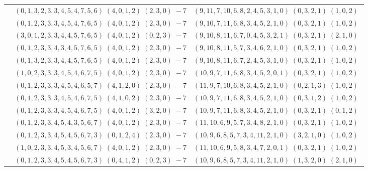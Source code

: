 \documentclass[11pt]{article}
\begin{document}
\begin{longtable}[l]{|c|c|c|}
 \cline{2-3} 
 & $(0 ,1 ,3 ,2 ,3 ,3 ,4 ,5 ,4 ,7 ,5 ,6) \;(4 ,0 ,1 ,2) \;(2 ,3 ,0) \;-7$ & $(9 ,11 ,7 ,10 ,6 ,8 ,2 ,4 ,5 ,3 ,1 ,0) \;(0 ,3 ,2 ,1) \;(1 ,0 ,2) \;$\\ 
 \cline{2-3} 
 & $(0 ,1 ,2 ,3 ,3 ,3 ,4 ,5 ,4 ,7 ,6 ,5) \;(4 ,0 ,1 ,2) \;(2 ,3 ,0) \;-7$ & $(9 ,10 ,7 ,11 ,6 ,8 ,3 ,4 ,5 ,2 ,1 ,0) \;(0 ,3 ,2 ,1) \;(1 ,0 ,2) \;$\\ 
 \cline{2-3} 
 & $(3 ,0 ,1 ,2 ,3 ,3 ,4 ,4 ,5 ,7 ,6 ,5) \;(4 ,0 ,1 ,2) \;(0 ,2 ,3) \;-7$ & $(9 ,10 ,8 ,11 ,6 ,7 ,0 ,4 ,5 ,3 ,2 ,1) \;(0 ,3 ,2 ,1) \;(2 ,1 ,0) \;$\\ 
 \cline{2-3} 
 & $(0 ,1 ,2 ,3 ,3 ,4 ,3 ,4 ,5 ,7 ,6 ,5) \;(4 ,0 ,1 ,2) \;(2 ,3 ,0) \;-7$ & $(9 ,10 ,8 ,11 ,5 ,7 ,3 ,4 ,6 ,2 ,1 ,0) \;(0 ,3 ,2 ,1) \;(1 ,0 ,2) \;$\\ 
 \cline{2-3} 
 & $(0 ,1 ,3 ,2 ,3 ,3 ,4 ,4 ,5 ,7 ,6 ,5) \;(4 ,0 ,1 ,2) \;(2 ,3 ,0) \;-7$ & $(9 ,10 ,8 ,11 ,6 ,7 ,2 ,4 ,5 ,3 ,1 ,0) \;(0 ,3 ,2 ,1) \;(1 ,0 ,2) \;$\\ 
 \cline{2-3} 
 & $(1 ,0 ,2 ,3 ,3 ,3 ,4 ,5 ,4 ,6 ,7 ,5) \;(4 ,0 ,1 ,2) \;(2 ,3 ,0) \;-7$ & $(10 ,9 ,7 ,11 ,6 ,8 ,3 ,4 ,5 ,2 ,0 ,1) \;(0 ,3 ,2 ,1) \;(1 ,0 ,2) \;$\\ 
 \cline{2-3} 
 & $(0 ,1 ,2 ,3 ,3 ,3 ,4 ,5 ,4 ,6 ,5 ,7) \;(4 ,1 ,2 ,0) \;(2 ,3 ,0) \;-7$ & $(11 ,9 ,7 ,10 ,6 ,8 ,3 ,4 ,5 ,2 ,1 ,0) \;(0 ,2 ,1 ,3) \;(1 ,0 ,2) \;$\\ 
 \cline{2-3} 
 & $(0 ,1 ,2 ,3 ,3 ,3 ,4 ,5 ,4 ,6 ,7 ,5) \;(4 ,1 ,0 ,2) \;(2 ,3 ,0) \;-7$ & $(10 ,9 ,7 ,11 ,6 ,8 ,3 ,4 ,5 ,2 ,1 ,0) \;(0 ,3 ,1 ,2) \;(1 ,0 ,2) \;$\\ 
 \cline{2-3} 
 & $(0 ,1 ,2 ,3 ,3 ,3 ,4 ,5 ,4 ,6 ,7 ,5) \;(4 ,0 ,1 ,2) \;(3 ,2 ,0) \;-7$ & $(10 ,9 ,7 ,11 ,6 ,8 ,3 ,4 ,5 ,2 ,1 ,0) \;(0 ,3 ,2 ,1) \;(0 ,1 ,2) \;$\\ 
 \cline{2-3} 
 & $(0 ,1 ,2 ,3 ,3 ,4 ,5 ,4 ,3 ,5 ,6 ,7) \;(4 ,0 ,1 ,2) \;(2 ,3 ,0) \;-7$ & $(11 ,10 ,6 ,9 ,5 ,7 ,3 ,4 ,8 ,2 ,1 ,0) \;(0 ,3 ,2 ,1) \;(1 ,0 ,2) \;$\\ 
 \cline{2-3} 
 & $(0 ,1 ,2 ,3 ,3 ,4 ,5 ,4 ,5 ,6 ,7 ,3) \;(0 ,1 ,2 ,4) \;(2 ,3 ,0) \;-7$ & $(10 ,9 ,6 ,8 ,5 ,7 ,3 ,4 ,11 ,2 ,1 ,0) \;(3 ,2 ,1 ,0) \;(1 ,0 ,2) \;$\\ 
 \cline{2-3} 
 & $(1 ,0 ,2 ,3 ,3 ,4 ,5 ,3 ,4 ,5 ,6 ,7) \;(4 ,0 ,1 ,2) \;(2 ,3 ,0) \;-7$ & $(11 ,10 ,6 ,9 ,5 ,8 ,3 ,4 ,7 ,2 ,0 ,1) \;(0 ,3 ,2 ,1) \;(1 ,0 ,2) \;$\\ 
 \cline{2-3} 
 & $(0 ,1 ,2 ,3 ,3 ,4 ,5 ,4 ,5 ,6 ,7 ,3) \;(0 ,4 ,1 ,2) \;(0 ,2 ,3) \;-7$ & $(10 ,9 ,6 ,8 ,5 ,7 ,3 ,4 ,11 ,2 ,1 ,0) \;(1 ,3 ,2 ,0) \;(2 ,1 ,0) \;$\\ 

\end{longtable}
\end{document}
